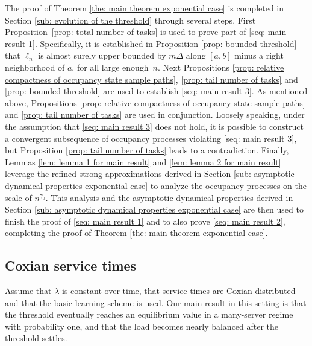 \documentclass[a4paper, 12pt]{article}
\theoremstyle{definition}
\begin{document}
The proof of Theorem \ref{the: main theorem exponential case} is completed in Section \ref{sub: evolution of the threshold} through several steps. First Proposition~\ref{prop: total number of tasks} is used to prove part of \eqref{seq: main result 1}. Specifically, it is established in Proposition \ref{prop: bounded threshold} that $\ell_n$ is almost surely upper bounded by $m \Delta$ along $[a, b]$ minus a right neighborhood of $a$, for all large enough~$n$. Next Propositions \ref{prop: relative compactness of occupancy state sample paths}, \ref{prop: tail number of tasks} and \ref{prop: bounded threshold} are used to establish \eqref{seq: main result 3}. As mentioned above, Propositions \ref{prop: relative compactness of occupancy state sample paths} and \ref{prop: tail number of tasks} are used in conjunction. Loosely speaking, under the assumption that \eqref{seq: main result 3} does not hold, it is possible to construct a convergent subsequence of occupancy processes violating \eqref{seq: main result 3}, but Proposition \ref{prop: tail number of tasks} leads to a contradiction. Finally, Lemmas \ref{lem: lemma 1 for main result} and \ref{lem: lemma 2 for main result} leverage the refined strong approximations derived in Section \ref{sub: asymptotic dynamical properties exponential case} to analyze the occupancy processes on the scale of $n^{\gamma_0}$. This analysis and the asymptotic dynamical properties derived in Section \ref{sub: asymptotic dynamical properties exponential case} are then used to finish the proof of \eqref{seq: main result 1} and to also prove \eqref{seq: main result 2}, completing the proof of Theorem \ref{the: main theorem exponential case}.

\subsection{Coxian service times}
\label{sub: coxian service times}

Assume that $\lambda$ is constant over time, that service times are Coxian distributed and that the basic learning scheme is used. Our main result in this setting is that the threshold eventually reaches an equilibrium value in a many-server regime with probability one, and that the load becomes nearly balanced after the threshold settles.
\end{document}
